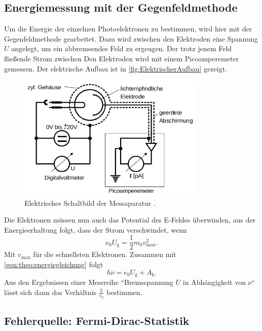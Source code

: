 \subsection{Energiemessung mit der Gegenfeldmethode}
\label{sec:Energiemessung mit der Gegenfeldmethode}

Um die Energie der einzelnen Photoelektronen zu bestimmen, wird hier mit der
Gegenfeldmethode gearbeitet. Dazu wird zwischen den Elektroden eine Spannung $U$ angelegt,
um ein abbremsendes Feld zu ergeugen. Der trotz jenem Feld fließende Strom zwischen Den
Elektroden wird mit einem Picoamperemeter gemessen. Der elektrische Aufbau ist in
\autoref{fig:ElektrischerAufbau} gezeigt.
\begin{figure}
	\centering
	\includegraphics[height=6cm]{pictures/ElektrischerAufbau.png}
	\caption{Elektrisches Schaltbild der Messaparatur \cite{anleitung}.}
	\label{fig:ElektrischerAufbau}
\end{figure}

Die Elektronen müssen nun auch das Potential des E-Feldes überwinden, aus der
Energieerhaltung folgt, dass der Strom verschwindet, wenn
\begin{equation}
	\label{eqn:v_max}
	e_0 U_\text{g} = \frac12 m_0 v_\text{max}^2.
\end{equation}
Mit $v_\text{max}$ für die schnellsten Elektronen. Zusammen mit \autoref{eqn:theo:energiegleichung}
folgt 
\begin{equation}
	h\nu = e_0 U_\text{g} + A_\text{k}.
\end{equation}
Aus den Ergebnissen einer Messreihe ``Bremsspannung $U$ in Abhängigkeit von $\nu$`` lässt
sich dann das Verhältnis $\frac{h}{e_0}$ bestimmen.

\subsection{Fehlerquelle: Fermi-Dirac-Statistik}
\label{sec:Fehlerquelle: Fermi-Dirac-Statistik}

